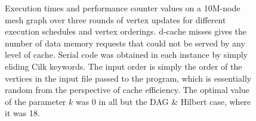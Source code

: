 \documentclass[journal]{IEEEtran}
\begin{document}
\begin{figure}[ht]
\centering
{}
\caption{Execution times and performance counter values on a 10M-node mesh graph over three rounds of vertex updates for different execution schedules and vertex orderings. d-cache misses gives the number of data memory requests that could not be served by any level of cache. Serial code was obtained in each instance by simply eliding Cilk keywords. The input order is simply the order of the vertices in the input file passed to the program, which is essentially random from the perspective of cache efficiency. The optimal value of the parameter $k$ was 0 in all but the DAG \& Hilbert case, where it was 18.}
\label{fig_result}
\end{figure}

\end{document}
